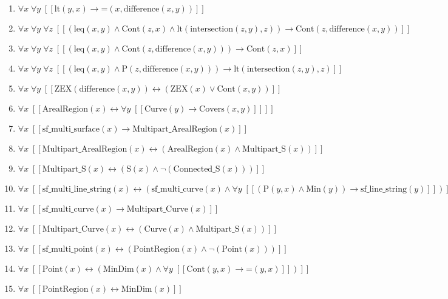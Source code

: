 \documentclass{article}
\begin{document}
\begin{enumerate}
\item $\forall x\; \forall y\;  \left[ \left[ \textrm{lt}(y,x) \rightarrow \textrm{=}(x,\textrm{difference}(x,y)) \right] \right]$
\item $\forall x\; \forall y\; \forall z\;  \left[ \left[ \left(\textrm{leq}(x,y) \land \textrm{Cont}(z,x) \land \textrm{lt}(\textrm{intersection}(z,y),z)\right) \rightarrow \textrm{Cont}(z,\textrm{difference}(x,y)) \right] \right]$
\item $\forall x\; \forall y\; \forall z\;  \left[ \left[ \left(\textrm{leq}(x,y) \land \textrm{Cont}(z,\textrm{difference}(x,y))\right) \rightarrow \textrm{Cont}(z,x) \right] \right]$
\item $\forall x\; \forall y\; \forall z\;  \left[ \left[ \left(\textrm{leq}(x,y) \land \textrm{P}(z,\textrm{difference}(x,y))\right) \rightarrow \textrm{lt}(\textrm{intersection}(z,y),z) \right] \right]$
\item $\forall x\; \forall y\;  \left[ \left[ \textrm{ZEX}(\textrm{difference}(x,y)) \leftrightarrow \left(\textrm{ZEX}(x) \lor \textrm{Cont}(x,y)\right) \right] \right]$
\item $\forall x\;  \left[ \left[ \textrm{ArealRegion}(x) \leftrightarrow \forall y\;  \left[ \left[ \textrm{Curve}(y) \rightarrow \textrm{Covers}(x,y) \right] \right] \right] \right]$
\item $\forall x\;  \left[ \left[ \textrm{sf\_multi\_surface}(x) \rightarrow \textrm{Multipart\_ArealRegion}(x) \right] \right]$
\item $\forall x\;  \left[ \left[ \textrm{Multipart\_ArealRegion}(x) \leftrightarrow \left(\textrm{ArealRegion}(x) \land \textrm{Multipart\_S}(x)\right) \right] \right]$
\item $\forall x\;  \left[ \left[ \textrm{Multipart\_S}(x) \leftrightarrow \left(\textrm{S}(x) \land \neg \left(\textrm{Connected\_S}(x)\right)\right) \right] \right]$
\item $\forall x\;  \left[ \left[ \textrm{sf\_multi\_line\_string}(x) \leftrightarrow \left(\textrm{sf\_multi\_curve}(x) \land \forall y\;  \left[ \left[ \left(\textrm{P}(y,x) \land \textrm{Min}(y)\right) \rightarrow \textrm{sf\_line\_string}(y) \right] \right]\right) \right] \right]$
\item $\forall x\;  \left[ \left[ \textrm{sf\_multi\_curve}(x) \rightarrow \textrm{Multipart\_Curve}(x) \right] \right]$
\item $\forall x\;  \left[ \left[ \textrm{Multipart\_Curve}(x) \leftrightarrow \left(\textrm{Curve}(x) \land \textrm{Multipart\_S}(x)\right) \right] \right]$
\item $\forall x\;  \left[ \left[ \textrm{sf\_multi\_point}(x) \leftrightarrow \left(\textrm{PointRegion}(x) \land \neg \left(\textrm{Point}(x)\right)\right) \right] \right]$
\item $\forall x\;  \left[ \left[ \textrm{Point}(x) \leftrightarrow \left(\textrm{MinDim}(x) \land \forall y\;  \left[ \left[ \textrm{Cont}(y,x) \rightarrow \textrm{=}(y,x) \right] \right]\right) \right] \right]$
\item $\forall x\;  \left[ \left[ \textrm{PointRegion}(x) \leftrightarrow \textrm{MinDim}(x) \right] \right]$
\end{enumerate}
\end{document}
